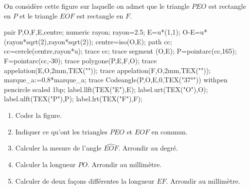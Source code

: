 \begin{exercice*}
    On considère cette figure sur laquelle on admet que le triangle $PEO$ est rectangle en $P$ et le triangle $EOF$ est rectangle en $F$.
    \begin{center}
        \begin{Geometrie}
            pair P,O,F,E,centre;
            numeric rayon;
            rayon=2.5;
            E=u*(1,1);
            O-E=u*(rayon*sqrt(2),rayon*sqrt(2));
            centre=iso(O,E);
            path cc;
            cc=cercle(centre,rayon*u);
            trace cc;
            trace segment (O,E);
            P=pointarc(cc,165);
            F=pointarc(cc,-30);
            trace polygone(P,E,F,O);
            trace appelation(E,O,2mm,TEX(""));
            trace appelation(F,O,2mm,TEX(""));
            marque_a:=0.8*marque_a;                
            trace Codeangle(P,O,E,0,TEX("\ang{37}")) withpen pencircle scaled 1bp;
            label.llft(TEX("E"),E);
            label.urt(TEX("O"),O);
            label.ulft(TEX("P"),P);
            label.lrt(TEX("F"),F);
        \end{Geometrie}
    \end{center}
    \begin{enumerate}
        \item Coder la figure.
        \item Indiquer ce qu'ont les triangles $PEO$ et $EOF$ en commun.
        \item Calculer la mesure de l'angle $\widehat{EOF}$. Arrondir au degré.
        \item Calculer la longueur $PO$. Arrondir au millimètre.
        \item Calculer de deux façons différentes la longueur $EF$. Arrondir au millimètre.
    \end{enumerate}
\end{exercice*}
